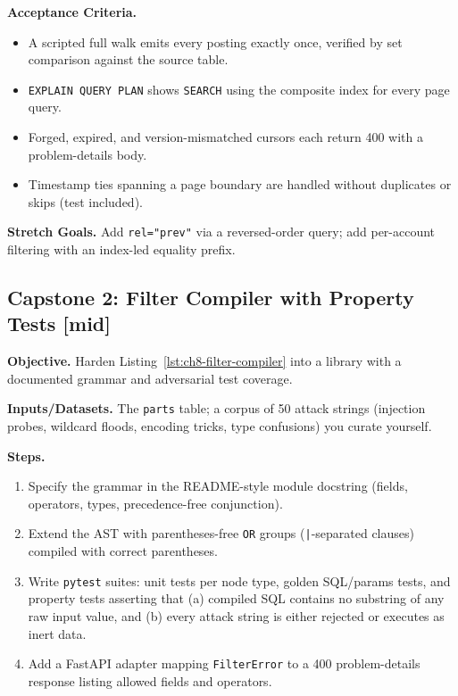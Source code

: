 \textbf{Acceptance Criteria.}
\begin{itemize}
  \item[$\square$] A scripted full walk emits every posting exactly once,
        verified by set comparison against the source table.
  \item[$\square$] \texttt{EXPLAIN QUERY PLAN} shows \texttt{SEARCH} using
        the composite index for every page query.
  \item[$\square$] Forged, expired, and version-mismatched cursors each
        return 400 with a problem-details body.
  \item[$\square$] Timestamp ties spanning a page boundary are handled
        without duplicates or skips (test included).
\end{itemize}

\textbf{Stretch Goals.} Add \texttt{rel="prev"} via a reversed-order
query; add per-account filtering with an index-led equality prefix.

\subsection{Capstone 2: Filter Compiler with Property Tests [mid]}

\textbf{Objective.} Harden Listing~\ref{lst:ch8-filter-compiler} into a
library with a documented grammar and adversarial test coverage.

\textbf{Inputs/Datasets.} The \texttt{parts} table; a corpus of 50 attack
strings (injection probes, wildcard floods, encoding tricks, type
confusions) you curate yourself.

\textbf{Steps.}
\begin{enumerate}
  \item Specify the grammar in the README-style module docstring (fields,
        operators, types, precedence-free conjunction).
  \item Extend the AST with parentheses-free \texttt{OR} groups
        (\texttt{|}-separated clauses) compiled with correct parentheses.
  \item Write \texttt{pytest} suites: unit tests per node type, golden
        SQL/params tests, and property tests asserting that (a) compiled
        SQL contains no substring of any raw input value, and (b) every
        attack string is either rejected or executes as inert data.
  \item Add a FastAPI adapter mapping \texttt{FilterError} to a 400
        problem-details response listing allowed fields and operators.
\end{enumerate}

